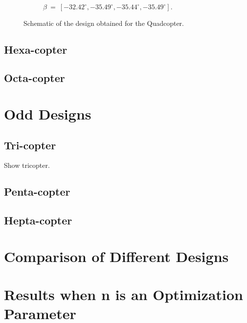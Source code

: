 \begin{figure}[!h]
{\begin{subfigure}[b]{0.6\textwidth}
    \caption{$\beta\ =\ [-32.42^{\circ}, -35.49^{\circ}, -35.44^{\circ},
    -35.49^{\circ}]$.} \label{fig:Quadcopter_deisgn2}
  \end{subfigure}}
  \caption{Schematic of the design obtained for the Quadcopter.}
  \label{fig:Quadcopter_equivalent}
\end{figure}

\subsection{Hexa-copter}
\label{sec:hexa_copter}

\subsection{Octa-copter}
\label{sec:octa_copter}

\section{Odd Designs}
\label{sec:odd_designs}

\subsection{Tri-copter}
\label{sec:tri_copter}
Show tricopter.

\subsection{Penta-copter}
\label{sec:penta_copter}

\subsection{Hepta-copter}
\label{sec:hepta_copter}

\section{Comparison of Different Designs}
\label{sec:comparison}
\section{Results when n is an Optimization Parameter}
\label{sec:result_n}


